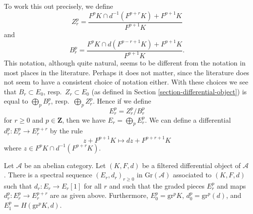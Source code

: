 \medskip\noindent
To work this out precisely, we define
$$
Z_r^p =
\frac{F^pK \cap d^{-1}(F^{p + r}K) + F^{p + 1}K}{F^{p + 1}K}
$$
and
$$
B_r^p =
\frac{F^pK \cap d(F^{p - r + 1}K) + F^{p + 1}K}{F^{p + 1}K}.
$$
This notation, although quite natural, seems to be different from the
notation in most places in the literature. Perhaps it does not matter,
since the literature does not seem to have a consistent choice of notation
either. With these choices we see that $B_r \subset E_0$,
resp.\ $Z_r \subset E_0$ (as defined in
Section \ref{section-differential-object}) is equal to
$\bigoplus_p B_r^p$, resp.\ $\bigoplus_p Z_r^p$.
Hence if we define
$$
E_r^p = Z_r^p/B_r^p
$$
for $r \geq 0$ and $p \in \mathbf{Z}$, then we have $E_r = \bigoplus_p E_r^p$.
We can define a differential $d_r^p : E_r^p \to E_r^{p + r}$
by the rule
$$
z + F^{p + 1}K
\longmapsto
dz + F^{p + r + 1}K
$$
where $z \in F^pK \cap d^{-1}(F^{p + r}K)$.

\begin{lemma}
\label{lemma-spectral-sequence-filtered-differential}
Let $\mathcal{A}$ be an abelian category. Let $(K, F, d)$ be a
filtered differential object of $\mathcal{A}$. There is a
spectral sequence $(E_r, d_r)_{r \geq 0}$ in $\text{Gr}(\mathcal{A})$
associated to $(K, F, d)$ such that $d_r : E_r \to E_r[1]$
for all $r$ and such that the graded pieces
$E_r^p$ and maps $d_r^p : E_r^p \to E_r^{p + r}$
are as given above. Furthermore, $E_0^p = \text{gr}^p K$,
$d_0^p = \text{gr}^p(d)$, and $E_1^p = H(\text{gr}^pK, d)$.
\end{lemma}


